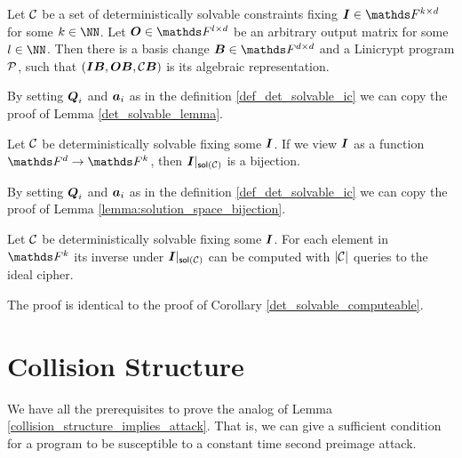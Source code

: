 \begin{lemma}
\label{det_solvable_lemma_ic}
    Let $\C$ be a set of deterministically solvable constraints fixing $\Inp \in \F^{k \times \base}$ for some $k \in \NN$.
    Let $\O \in \F^{\out \times \base}$ be an arbitrary output matrix for some $\out \in \NN$.
    Then there is a basis change $\B \in \F^{\base \times \base}$
    and a Linicrypt program $\P$,
    such that $(\Inp \B, \O \B, \C \B)$ is its algebraic representation.
\end{lemma}

\begin{sketch}
    By setting $\Q_i$ and $\va_i$ as in the definition \ref{def_det_solvable_ic} we can copy the proof of Lemma \ref{det_solvable_lemma}.
\end{sketch}

\begin{lemma}
\label{lemma:solution_space_bijection_ic}
    Let $\C$ be deterministically solvable fixing some $\I$.
    If we view $\I$ as a function $\Fsp \to \F^k$,
    then $\I|_{\sol(\C)}$ is a bijection.
\end{lemma}

\begin{sketch}
    By setting $\Q_i$ and $\va_i$ as in the definition \ref{def_det_solvable_ic} we can copy the proof of Lemma \ref{lemma:solution_space_bijection}.
\end{sketch}

\begin{corollary}
\label{corollary:det_solvable_computeable_ic}
    Let $\C$ be deterministically solvable fixing some $\I$.
    For each element in $\F^k$ its inverse under $\I|_{\sol(\C)}$ can be computed with $|\C|$ queries to the ideal cipher.
\end{corollary}

\begin{sketch}
    The proof is identical to the proof of Corollary \ref{det_solvable_computeable}.
\end{sketch}

\section{Collision Structure}

We have all the prerequisites to prove the analog of Lemma \ref{collision_structure_implies_attack}.
That is, we can give a sufficient condition for a program to be susceptible to a constant time second preimage attack.

